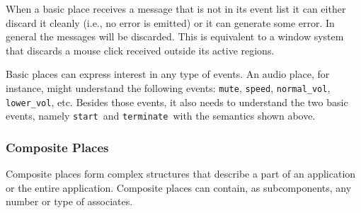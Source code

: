 \documentclass[twocolumn,10pt]{article}
\newcommand{\term}{{\tt terminate}}
\newcommand{\theEnd}{{\tt end}}
\newcommand{\finished}{{\tt finished}}
\newcommand{\start}{{\tt start}}
\newcommand{\termRep}{TERMINATE}
\newcommand{\theEndRep}{END}
\newcommand{\startRep}{START}
\newcommand{\event}[1]{{\tt #1}}
\begin{document}
When a basic place receives a message that is not in its event list it
can either discard it cleanly (i.e., no error is emitted) or it can
generate some error.  In general the messages will be discarded.  This
is equivalent to a window system that discards a mouse click received
outside its active regions.

Basic places can express interest in any type of events.  An audio
place, for instance, might understand the following events:
\event{mute}, \event{speed}, \event{normal\_vol},
\event{lower\_vol}, etc.  Besides those events, it also needs to
understand the two basic events, namely \start\ and \term\ with
the semantics shown above.


\subsubsection*{Composite Places}

Composite places form complex structures that describe a part of an
application or the
entire application.  Composite places can contain, as
subcomponents, any number or type of associates.
\end{document}
